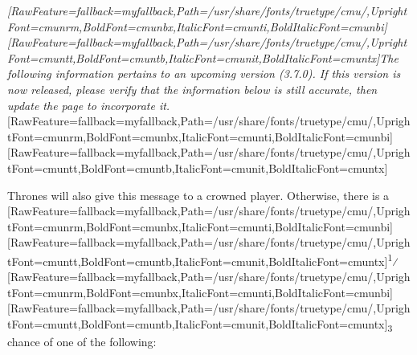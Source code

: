 {\itshape \allowbreak{}\setmainfont{cmunti.ttf}[RawFeature={fallback=myfallback},Path=/usr/share/fonts/truetype/cmu/,UprightFont=cmunrm,BoldFont=cmunbx,ItalicFont=cmunti,BoldItalicFont=cmunbi]\setmonofont{cmunti.ttf}[RawFeature={fallback=myfallback},Path=/usr/share/fonts/truetype/cmu/,UprightFont=cmuntt,BoldFont=cmuntb,ItalicFont=cmunit,BoldItalicFont=cmuntx]\itshape The following information pertains to an upcoming version (3.7.0\footnotemark[49]). If this version is now released, please verify that the information below is still accurate, then update the page to incorporate it.}\allowbreak{}\setmainfont{cmunrm.ttf}[RawFeature={fallback=myfallback},Path=/usr/share/fonts/truetype/cmu/,UprightFont=cmunrm,BoldFont=cmunbx,ItalicFont=cmunti,BoldItalicFont=cmunbi]\setmonofont{cmunrm.ttf}[RawFeature={fallback=myfallback},Path=/usr/share/fonts/truetype/cmu/,UprightFont=cmuntt,BoldFont=cmuntb,ItalicFont=cmunit,BoldItalicFont=cmuntx]



Thrones will also give this message to a crowned\footnotemark[50] player.
Otherwise, there is a \allowbreak{}\setmainfont{cmunrm.ttf}[RawFeature={fallback=myfallback},Path=/usr/share/fonts/truetype/cmu/,UprightFont=cmunrm,BoldFont=cmunbx,ItalicFont=cmunti,BoldItalicFont=cmunbi]\setmonofont{cmunrm.ttf}[RawFeature={fallback=myfallback},Path=/usr/share/fonts/truetype/cmu/,UprightFont=cmuntt,BoldFont=cmuntb,ItalicFont=cmunit,BoldItalicFont=cmuntx]\textsuperscript{1}⁄\allowbreak{}\setmainfont{cmunrm.ttf}[RawFeature={fallback=myfallback},Path=/usr/share/fonts/truetype/cmu/,UprightFont=cmunrm,BoldFont=cmunbx,ItalicFont=cmunti,BoldItalicFont=cmunbi]\setmonofont{cmunrm.ttf}[RawFeature={fallback=myfallback},Path=/usr/share/fonts/truetype/cmu/,UprightFont=cmuntt,BoldFont=cmuntb,ItalicFont=cmunit,BoldItalicFont=cmuntx]\textsubscript{3} chance of one of the following:




